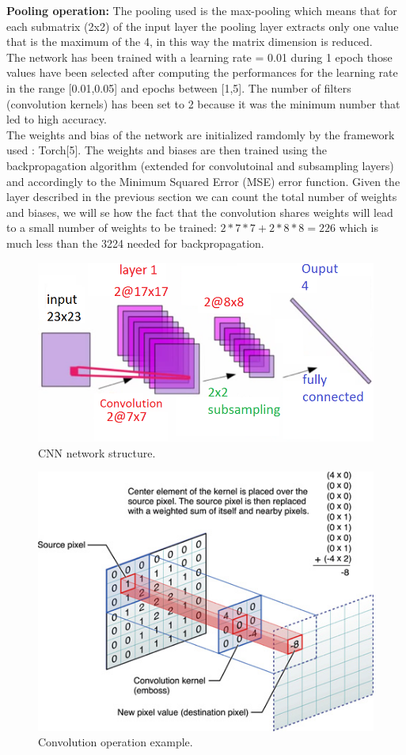 \documentclass[a4paper, 10pt, conference]{ieeeconf}      %
\begin{document}
 \textbf{Pooling operation:} The pooling used is the
 max-pooling which means that for each submatrix
 (2x2) of the input layer the pooling layer extracts
 only one value that is the maximum of the 4, in
 this way the matrix dimension is reduced.\\
 The network has been trained with a learning
 rate = 0.01 during 1 epoch those values have been selected
 after computing the performances for the learning rate in the range [0.01,0.05] and epochs between [1,5]. The number of filters (convolution kernels) has been set to 2 because it was the minimum number that led to high accuracy.\\
 The weights and bias of the
 network are initialized ramdomly by the framework
 used : Torch[5]. The weights and biases are
 then trained using the backpropagation algorithm
 (extended for convolutoinal and subsampling layers)
 and accordingly to the Minimum Squared
 Error (MSE) error function.
 Given the layer described in the previous section
 we can count the total number of weights and
 biases, we will se how the fact that the convolution
 shares weights will lead to a small number of
 weights to be trained:
 $2*7*7+2*8*8=226$ which is much less than the 3224 needed for backpropagation.
	\begin{figure}[thpb]
		\centering
		\includegraphics[scale=0.4]{cnn.png}
		\caption{CNN network structure.}
		\label{cnn}
	\end{figure}
		\begin{figure}[thpb]
			\centering
			\includegraphics[scale=0.5]{convolution.jpg}
			\caption{Convolution operation example.}
			\label{conv}
		\end{figure}
\end{document}
